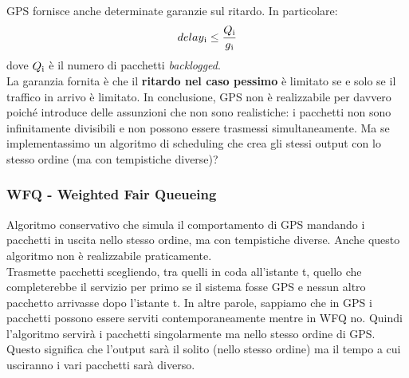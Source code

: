 \documentclass{article}
\begin{document}
GPS fornisce anche determinate garanzie sul ritardo. In particolare:
\[
delay\textsubscript{i} \leq \frac{Q\textsubscript{i}}{g\textsubscript{i}}
\]
dove \(Q\textsubscript{i}\) è il numero di pacchetti \textit{backlogged}.\\
La garanzia fornita è che il \textbf{ritardo nel caso pessimo} è limitato se e solo se il traffico in arrivo è limitato.
In conclusione, GPS non è realizzabile per davvero poiché introduce delle assunzioni che non sono realistiche:  i pacchetti non sono infinitamente divisibili e non possono essere trasmessi simultaneamente. Ma se implementassimo un algoritmo di scheduling che crea gli stessi output con lo stesso ordine (ma con tempistiche diverse)?

\subsubsection{WFQ - Weighted Fair Queueing}
Algoritmo conservativo che simula il comportamento di GPS mandando i pacchetti in uscita nello stesso ordine, ma con tempistiche diverse. Anche questo algoritmo non è realizzabile praticamente.\\
Trasmette pacchetti scegliendo, tra quelli in coda all'istante t, quello che completerebbe il servizio per primo se il sistema fosse GPS e nessun altro pacchetto arrivasse dopo l'istante t. In altre parole, sappiamo che in GPS i pacchetti possono essere serviti contemporaneamente mentre in WFQ no. Quindi l'algoritmo servirà i pacchetti singolarmente ma nello stesso ordine di GPS. Questo significa che l'output sarà il solito (nello stesso ordine) ma il tempo a cui usciranno i vari pacchetti sarà diverso.
\end{document}
